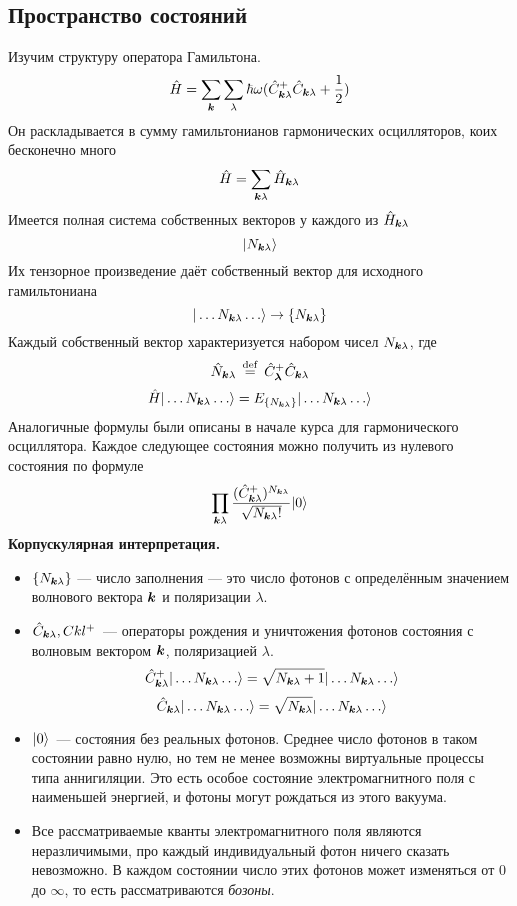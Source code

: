 \subsection{Пространство состояний}
Изучим структуру оператора Гамильтона.
$$
    \Hat H = \sum_{\bf k} \sum_{\lambda} \hbar \omega (\hat C_{\bf k \lambda}^{+} \hat C_{\bf k \lambda} + \frac12)
$$
Он раскладывается в сумму гамильтонианов гармонических осцилляторов, коих бесконечно много
$$
    \hat H = \sum_{\bf k \lambda} \hat H_{\bf k \lambda}
$$
Имеется полная система собственных векторов у каждого из $\hat H_{\bf k \lambda}$
$$
    \qu{N_{\bf k \lambda}}
$$
Их тензорное произведение даёт собственный вектор для исходного гамильтониана
$$
    \qu{\ldots N_{\bf k \lambda} \ldots} \to \{N_{\bf k \lambda}\}
$$
Каждый собственный вектор характеризуется набором чисел $N_{\bf k \lambda}$, где
$$
    \hat N_{\bf k \lambda} \eqdef \hat C_{\bf  \lambda}^+ \hat C_{\bf k \lambda}
$$
\def \Ckl {\hat C_{\bf k \lambda}}
$$
    \Hat H \qu{\ldots N_{\bf k \lambda} \ldots} = E_{\{N_{\bf k \lambda}\}} \qu{\ldots N_{\bf k \lambda} \ldots}
$$
Аналогичные формулы были описаны в начале курса для гармонического осциллятора. Каждое следующее состояния можно получить из нулевого состояния по формуле
$$
    \prod_{\bf k \lambda} \dfrac{(\Ckl^+)^{N_{\bf k \lambda}}}{\sqrt{N_{\bf k \lambda}!}} \qu{0}
$$
\textbf{Корпускулярная интерпретация.}

\begin{itemize}
  \item $\{ N_{\bf k \lambda} \}$ --- число заполнения --- это число фотонов с определённым значением волнового вектора $\bf k$ и поляризации $\lambda$.
  \item $\Ckl, Ckl^+$~--- операторы рождения и уничтожения фотонов состояния с волновым вектором $\bf k$, поляризацией $\lambda$.
      \def \Nkl{N_{\bf k \lambda}}
      $$
        \Ckl^+ \qu{\ldots N_{\bf k \lambda} \ldots} = \sqrt{N_{\bf k \lambda} + 1} \qu{\ldots \Nkl \ldots}
      $$
      $$
        \Ckl \qu{\ldots N_{\bf k \lambda} \ldots} = \sqrt{N_{\bf k \lambda}} \qu{\ldots \Nkl \ldots}
      $$
  \item $\qu{0}$~--- состояния без реальных фотонов. Среднее число фотонов в таком состоянии равно нулю, но тем не менее возможны виртуальные процессы типа аннигиляции. Это есть особое состояние электромагнитного поля с наименьшей энергией, и фотоны могут рождаться из этого вакуума.
  \item Все рассматриваемые кванты электромагнитного поля являются неразличимыми, про каждый индивидуальный фотон ничего сказать невозможно. В каждом состоянии число этих фотонов может изменяться от $0$ до $\infty$, то есть рассматриваются \emph{бозоны}.
\end{itemize}

